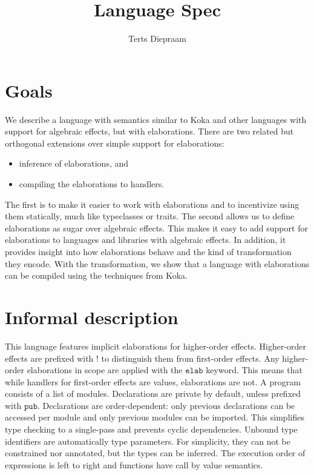 \documentclass{article}
\title{Language Spec}
\author{Terts Diepraam}
\date{}
\newcommand\kw[1]{\ensuremath{\mathbf{\mathtt{#1}}}}
\begin{document}
\maketitle

\section{Goals}

We describe a language with semantics similar to Koka and other languages with support for algebraic effects, but with elaborations. There are two related but orthogonal extensions over simple support for elaborations:
\begin{itemize}
\item inference of elaborations, and
\item compiling the elaborations to handlers.
\end{itemize}

The first is to make it easier to work with elaborations and to incentivize using them statically, much like typeclasses or traits. The second allows us to define elaborations as sugar over algebraic effects. This makes it easy to add support for elaborations to languages and libraries with algebraic effects. In addition, it provides insight into how elaborations behave and the kind of transformation they encode. With the transformation, we show that a language with elaborations can be compiled using the techniques from Koka.

\section{Informal description}

This language features implicit elaborations for higher-order effects. Higher-order effects are prefixed with $!$ to distinguish them from first-order effects. Any higher-order elaborations in scope are applied with the \kw{elab} keyword. This means that while handlers for first-order effects are values, elaborations are not. A program consists of a list of modules. Declarations are private by default, unless prefixed with \kw{pub}. Declarations are order-dependent: only previous declarations can be accessed per module and only previous modules can be imported. This simplifies type checking to a single-pass and prevents cyclic dependencies. Unbound type identifiers are automatically type parameters. For simplicity, they can not be constrained nor annotated, but the types can be inferred. The execution order of expressions is left to right and functions have call by value semantics.
\end{document}
